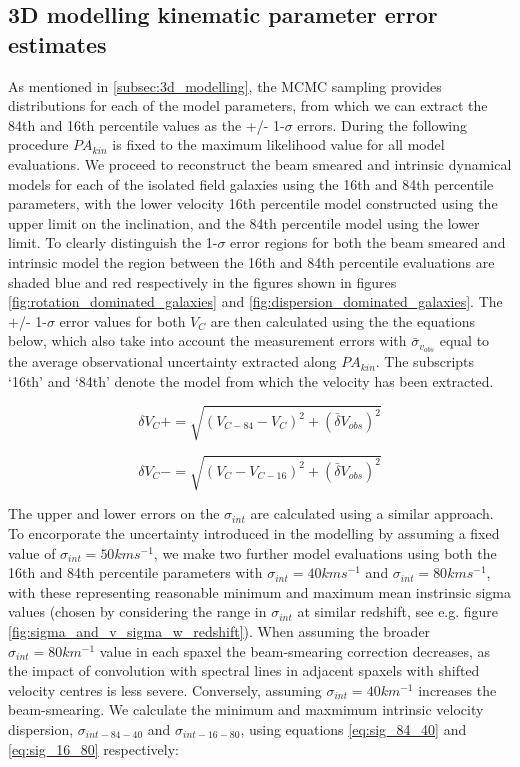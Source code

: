 \documentclass[fleqn,usenatbib]{mn2e}
\begin{document}
\subsection{3D modelling kinematic parameter error estimates}\label{appsubsec:model_errors}
As mentioned in \cref{subsec:3d_modelling}, the MCMC sampling provides distributions for each of the model parameters, from which we can extract the 84th and 16th percentile values as the +/- 1-$\sigma$ errors.
During the following procedure $PA_{kin}$ is fixed to the maximum likelihood value for all model evaluations.
We proceed to reconstruct the beam smeared and intrinsic dynamical models for each of the isolated field galaxies using the 16th and 84th percentile parameters, with the lower velocity 16th percentile model constructed using the upper limit on the inclination, and the 84th percentile model using the lower limit.
To clearly distinguish the 1-$\sigma$ error regions for both the beam smeared and intrinsic model the region between the 16th and 84th percentile evaluations are shaded blue and red respectively in the figures shown in figures \ref{fig:rotation_dominated_galaxies} and \ref{fig:dispersion_dominated_galaxies}.
The +/- 1-$\sigma$ error values for both $V_{C}$ are then calculated using the the equations below, which also take into account the measurement errors with $\bar{\sigma}_{v_{obs}}$ equal to the average observational uncertainty extracted along $PA_{kin}$.
The subscripts `16th' and `84th' denote the model from which the velocity has been extracted.


\begin{equation}\label{eq:VC_plus}
   \delta V_{C}+ = \sqrt{\left(V_{C-84} - V_{C}\right)^{2} + \left(\bar{\delta}V_{obs}\right)^{2}}
\end{equation}

\begin{equation}\label{eq:VC_minus}
   \delta V_{C}- = \sqrt{\left(V_{C} - V_{C-16}\right)^{2}  + \left(\bar{\delta}V_{obs}\right)^{2}}
\end{equation}

The upper and lower errors on the $\sigma_{int}$ are calculated using a similar approach.
To encorporate the uncertainty introduced in the modelling by assuming a fixed value of $\sigma_{int}=50kms^{-1}$, we make two further model evaluations using both the 16th and 84th percentile parameters with $\sigma_{int} = 40kms^{-1}$ and $\sigma_{int} = 80kms^{-1}$, with these representing reasonable minimum and maximum mean instrinsic sigma values (chosen by considering the range in $\sigma_{int}$ at similar redshift, see e.g. figure \ref{fig:sigma_and_v_sigma_w_redshift}).
When assuming the broader $\sigma_{int} = 80km^{-1}$ value in each spaxel the beam-smearing correction decreases, as the impact of convolution with spectral lines in adjacent spaxels with shifted velocity centres is less severe.
Conversely, assuming $\sigma_{int} = 40km^{-1}$ increases the beam-smearing.
We calculate the minimum and maxmimum intrinsic velocity dispersion, $\sigma_{int-84-40}$ and $\sigma_{int-16-80}$, using equations \ref{eq:sig_84_40} and \ref{eq:sig_16_80} respectively:
\end{document}

